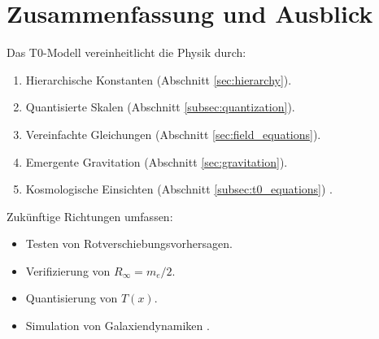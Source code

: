 \documentclass[12pt,a4paper]{article}
\newcommand{\Tfield}{T(x)}
\begin{document}
\section{Zusammenfassung und Ausblick}
\label{sec:outlook}

Das T0-Modell vereinheitlicht die Physik durch:
\begin{enumerate}
\item Hierarchische Konstanten (Abschnitt \ref{sec:hierarchy}).
\item Quantisierte Skalen (Abschnitt \ref{subsec:quantization}).
\item Vereinfachte Gleichungen (Abschnitt \ref{sec:field_equations}).
\item Emergente Gravitation (Abschnitt \ref{sec:gravitation}).
\item Kosmologische Einsichten (Abschnitt \ref{subsec:t0_equations}) \cite{pascher_alphabeta_2025}.
\end{enumerate}

Zukünftige Richtungen umfassen:
\begin{itemize}
\item Testen von Rotverschiebungsvorhersagen.
\item Verifizierung von \(R_\infty = m_e/2\).
\item Quantisierung von \(\Tfield\).
\item Simulation von Galaxiendynamiken \cite{pascher_galaxies_2025}.
\end{itemize}
\end{document}
